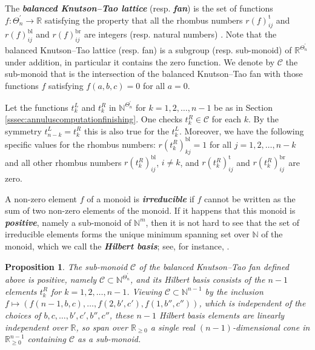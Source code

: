 \documentclass[12pt,
	]{amsart}
\newtheorem{proposition}[theorem]{Proposition}
\theoremstyle{definition}
\newcommand{\mrm}[1]{\mathrm{#1}}
\newcommand{\mbb}[1]{\mathbb{#1}}
\newcommand{\mcal}[1]{\mathcal{#1}}
\newcommand{\define}[1]{{\textit{\textbf{#1}}}}
\newcommand{\nnegZ}{\mbb{N}}
\newcommand{\R}{\mbb{R}}
\newcommand{\discrete}{\Theta_n}
\newcommand{\cornerlessdiscrete}{\discrete^\prime}
\newcommand{\fan}{\mcal{C}}
\begin{document}
The \define{balanced Knutson--Tao lattice} (resp. \define{fan}) is the set of functions $f:\cornerlessdiscrete\to\R$ satisfying the property that all the rhombus numbers $r(f)^\mrm{t}_{ij}$ and $r(f)^\mrm{bl}_{ij}$ and $r(f)^\mrm{br}_{ij}$ are integers (resp. natural numbers)  \cite{KnutsonJAmerMathsoc99}.  Note that the balanced Knutson--Tao lattice (resp. fan) is a subgroup (resp. sub-monoid) of $\R^{\cornerlessdiscrete}$ under addition, in particular it contains the zero function.  We denote by $\fan$ the sub-monoid that is the intersection of the balanced Knutson--Tao fan with those functions $f$ satisfying $f(a,b,c)=0$ for all $a=0$.  

Let the functions $t^L_k$ and $t^R_k$ in $\nnegZ^{\cornerlessdiscrete}$ for $k=1,2,\dots,n-1$ be as in Section \ref{sssec:annuluscomputationfinishing}.  One checks $t^R_k\in\fan$ for each $k$.  By the symmetry $t^L_{n-k}=t^R_{k}$ this is also true for the $t^L_k$.  Moreover, we have the following specific values for the rhombus numbers:  $r(t^R_k)^\mrm{bl}_{kj}=1$ for all $j=1,2,\dots,n-k$ and all other rhombus numbers $r(t^R_k)^\mrm{bl}_{ij}$, $i\neq k$, and $r(t^R_k)^\mrm{t}_{ij}$ and $r(t^R_k)^\mrm{br}_{ij}$ are zero. 

A non-zero element $f$ of a monoid is \define{irreducible} if $f$ cannot be written as the sum of two non-zero elements of the monoid.  If it happens that this monoid is \define{positive}, namely a sub-monoid of $\nnegZ^m$, then it is not hard to see that the set of irreducible elements forms the unique minimum spanning set over $\nnegZ$ of the monoid, which we call the \define{Hilbert basis}; see, for instance, \cite[Section 3]{douglas2022tropical}.  

\begin{proposition}\label{thm:KTfan}
The sub-monoid $\fan$ of the balanced Knutson--Tao fan defined above is positive, namely $\fan\subset\nnegZ^{\cornerlessdiscrete}$, and its Hilbert basis consists of the $n-1$ elements $t^R_k$ for $k=1,2,\dots,n-1$.  Viewing $\fan\subset\nnegZ^{n-1}$ by the inclusion $f\mapsto(f(n-1,b,c), \dots, f(2,b',c'), f(1,b'',c''))$, which is independent of the choices of $b,c,\dots,b',c',b'',c''$, these $n-1$ Hilbert basis elements are linearly independent over $\R$, so span over $\R_{\geq0}$ a single real $(n-1)$-dimensional cone in $\R_{\geq0}^{n-1}$ containing $\fan$ as a sub-monoid.  
\end{proposition}
\end{document}

